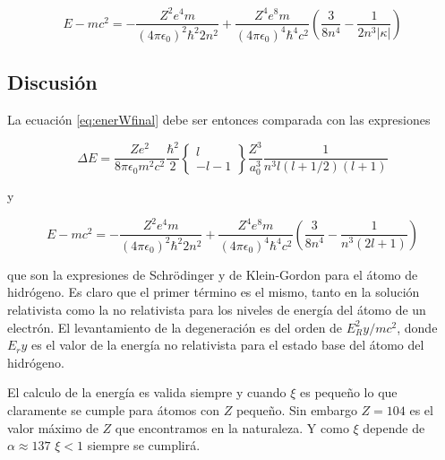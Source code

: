 \documentclass[a4paper, 12pt]{article} %
\begin{document}
\begin{equation}\label{eq:enerWfinal}
E-mc^2 = -\frac{Z^2e^4m}{(4\pi\epsilon_0)^2\hbar^2 2n^2}+\frac{Z^4e^8m}{(4\pi\epsilon_0)^4\hbar^4 c^2} \left( \frac{ 3}{8n^4}-\frac{1}{2n^3|\kappa|} \right)
\end{equation}


\subsection{Discusi\'on}

La ecuaci\'on \ref{eq:enerWfinal} debe ser entonces comparada con las expresiones 

\begin{equation}
\Delta E = \frac{Ze^2}{8\pi \epsilon_0 m^2c^2}\frac{\hbar^2}{2} \left\{ \substack{ l \\ -l -1}   \right\}\frac{Z^3}{a^3_0}\frac{1}{n^3 l (l+1/2)(l+1)}
\end{equation}

y 

\begin{equation}
E-mc^2 = -\frac{Z^2e^4m}{(4\pi\epsilon_0)^2\hbar^2 2n^2}+\frac{Z^4e^8m}{(4\pi\epsilon_0)^4\hbar^4 c^2} \left( \frac{ 3}{8n^4}-\frac{1}{n^3(2l+1)} \right)
\end{equation}

que son la expresiones de Schr\"odinger y de Klein-Gordon para el \'atomo de hidr\'ogeno. Es claro que el primer t\'ermino es el mismo, tanto en la soluci\'on relativista como la no relativista para los niveles de energ\'ia del \'atomo de un electr\'on. El levantamiento de la degeneraci\'on es del orden de $E^2_Ry/mc^2$, donde $E_ry$ es el valor de la energ\'ia no relativista para el estado base del \'atomo del hidr\'ogeno.

El calculo de la energ\'ia es valida siempre y cuando $\xi$ es peque\~no lo que claramente
se cumple para \'atomos con $Z$ peque\~no. Sin embargo $Z = 104 $ es el valor m\'aximo 
de $Z$ que encontramos en la naturaleza. Y como $\xi$ depende de $\alpha \approx 137$
$\xi<1$ siempre se cumplir\'a.  
\end{document}
